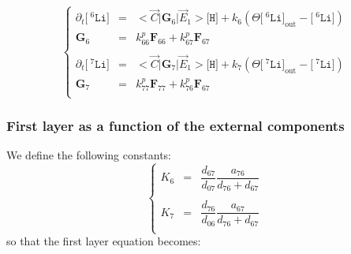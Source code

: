 \documentclass[aps,onecolumn,11pt]{revtex4}
\newcommand{\mychem}[1]{\mathtt{#1}}
\newcommand{\myconc}[1]{\big[#1\big]}
\newcommand{\spLi}[1]{{\!~^{#1}\mychem{Li}}}
\newcommand{\Li}[1]{\myconc{\spLi{#1}}}
\newcommand{\spproton}{\mychem{H}}
\newcommand{\proton}{\myconc{\spproton}}
\newcommand{\myout}[1]{{#1}_{\mathrm{out}}}
\newcommand{\LiOut}[1]{\myout{\Li{#1}}}
\newcommand{\mymat}[1]{{\bm{#1}}}
\begin{document}
\begin{equation}
\left\lbrace
\begin{array}{rcl}
	\partial_t \Li{6} & = & <\vec{C}|\mymat{G}_6|\vec{E}_1> \proton+ k_6\left(\Theta \LiOut{6} - \Li{6}\right)\\
	\mymat{G}_6 &= & k^p_{66} \mymat{F}_{66} + k^p_{67}\mymat{F}_{67} 
	\\
	\\
	\partial_t \Li{7} & = & <\vec{C}|\mymat{G}_7|\vec{E}_1> \proton + k_7\left(\Theta \LiOut{7} - \Li{7}\right)\\
	\mymat{G}_7 & = & k^p_{77} \mymat{F}_{77} + k^p_{76}\mymat{F}_{67} 
	\\
\end{array}
\right.
\end{equation}


\subsubsection{First layer as a function of the external components}
We define the following constants:
\begin{equation}
\left\lbrace
\begin{array}{rcl}
K_6 & = & \dfrac{d_{67}}{d_{07}}\dfrac{a_{76}}{d_{76}+d_{67}} \\
\\
K_7 & = &  \dfrac{d_{76}}{d_{06}}\dfrac{a_{67}}{d_{76}+d_{67}}\\
\end{array}
\right.
\end{equation}
so that the first layer equation becomes:
	
\end{document}
